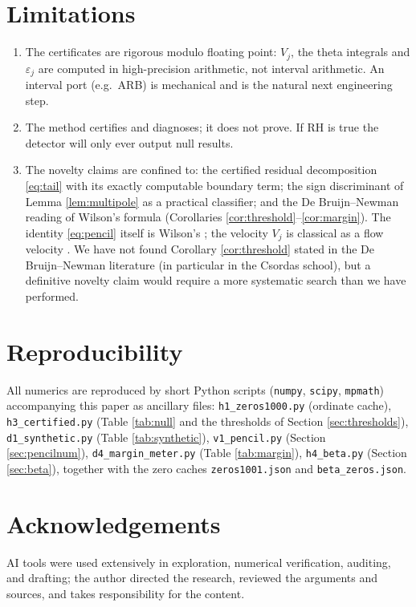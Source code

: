 \documentclass[11pt]{amsart}
\theoremstyle{remark}
\begin{document}
\section{Limitations}\label{sec:limitations}

\begin{enumerate}
\item The certificates are rigorous modulo floating point: $V_j$, the theta integrals and $\varepsilon_j$ are computed in high-precision arithmetic, not interval arithmetic. An interval port (e.g.\ ARB) is mechanical and is the natural next engineering step.
\item The method certifies and diagnoses; it does not prove. If RH is true the detector will only ever output null results.
\item The novelty claims are confined to: the certified residual decomposition \eqref{eq:tail} with its exactly computable boundary term; the sign discriminant of Lemma \ref{lem:multipole} as a practical classifier; and the De Bruijn--Newman reading of Wilson's formula (Corollaries \ref{cor:threshold}--\ref{cor:margin}). The identity \eqref{eq:pencil} itself is Wilson's \cite{Wilson}; the velocity $V_j$ is classical as a flow velocity \cite{RT}. We have not found Corollary \ref{cor:threshold} stated in the De Bruijn--Newman literature (in particular in the Csordas school), but a definitive novelty claim would require a more systematic search than we have performed.
\end{enumerate}

\section{Reproducibility}\label{sec:repro}

All numerics are reproduced by short Python scripts (\texttt{numpy}, \texttt{scipy}, \texttt{mpmath}) accompanying this paper as ancillary files: \texttt{h1\_zeros1000.py} (ordinate cache), \texttt{h3\_certified.py} (Table \ref{tab:null} and the thresholds of Section \ref{sec:thresholds}), \texttt{d1\_synthetic.py} (Table \ref{tab:synthetic}), \texttt{v1\_pencil.py} (Section \ref{sec:pencilnum}), \texttt{d4\_margin\_meter.py} (Table \ref{tab:margin}), \texttt{h4\_beta.py} (Section \ref{sec:beta}), together with the zero caches \texttt{zeros1001.json} and \texttt{beta\_zeros.json}.

\section*{Acknowledgements}
AI tools were used extensively in exploration, numerical verification,
auditing, and drafting; the author directed the research, reviewed the
arguments and sources, and takes responsibility for the content.
\end{document}
